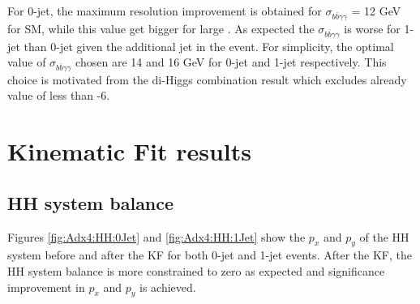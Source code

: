 For 0-jet, the maximum \mbb resolution improvement is obtained for $\sigma_{b\bar{b}\gamma\gamma}$ = 12 GeV for SM, while this value get bigger for large \kl. As expected the $\sigma_{b\bar{b}\gamma\gamma}$ is worse for 1-jet than 0-jet given the additional jet in the event. For simplicity, the optimal value of $\sigma_{b\bar{b}\gamma\gamma}$ chosen are 14 and 16 GeV for 0-jet and 1-jet respectively. This choice is motivated from the di-Higgs combination result which excludes already value of \kl less than -6.  

\section{Kinematic Fit results}

\subsection{HH system balance}
Figures \ref{fig:Adx4:HH:0Jet} and \ref{fig:Adx4:HH:1Jet} show the $p_x$ and $p_y$ of the HH system before and after the KF for both 0-jet and 1-jet events. After the KF, the HH system balance is more constrained to zero as expected and significance improvement in $p_x$ and $p_y$ is achieved. 

